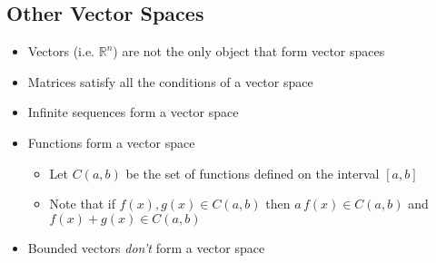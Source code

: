 \begin{slide}
\section{Other Vector Spaces}

\begin{PauseHighLight}
  \begin{itemize}
  \item Vectors (i.e. $\mathbb{R}^n$) are not the only object that
    form vector spaces\pause 
  \item Matrices satisfy all the conditions of a vector space\pause
  \item Infinite sequences form a vector space\pause
  \item Functions form a vector space\pause
    \begin{itemize}\squeeze
    \item Let $C(a,b)$ be the set of functions defined on the interval
      $[a,b]$
    \item Note that if $f(x), g(x) \in C(a,b)$ then $a\,f(x) \in C(a,b)$
      and $f(x)+g(x) \in C(a,b)$\pause
    \end{itemize}
  \item Bounded vectors \emph{don't} form a vector space\pause
  \end{itemize}
\end{PauseHighLight}

\end{slide}

\Outline

